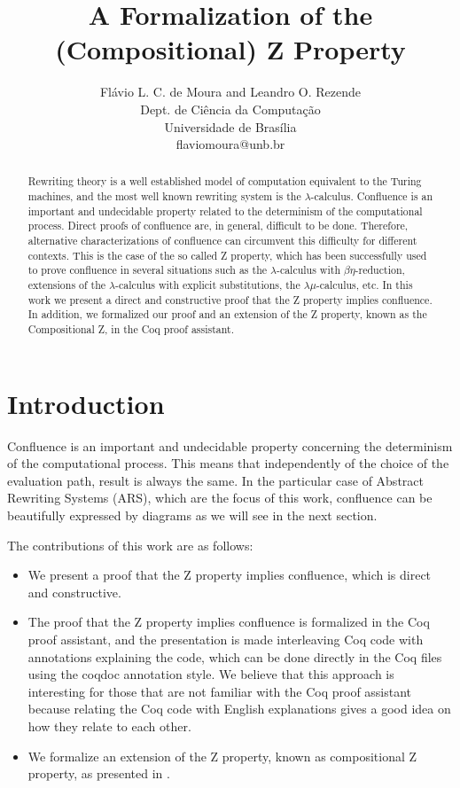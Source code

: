 \documentclass[a4paper]{article}
\title{A Formalization of the (Compositional) Z Property}
\author{
Flávio L. C. de Moura and Leandro O. Rezende\\ Dept. de Ciência da Computação\\
                Universidade de Brasília \\ flaviomoura@unb.br
}
\begin{document}
\maketitle

\begin{abstract}
  Rewriting theory is a well established model of computation
  equivalent to the Turing machines, and the most well known rewriting
  system is the $\lambda$-calculus. Confluence is an important and
  undecidable property related to the determinism of the computational
  process. Direct proofs of confluence are, in general, difficult to
  be done. Therefore, alternative characterizations of confluence can
  circumvent this difficulty for different contexts. This is the case
  of the so called Z property, which has been successfully used to
  prove confluence in several situations such as the
  $\lambda$-calculus with $\beta\eta$-reduction, extensions of the
  $\lambda$-calculus with explicit substitutions, the
  $\lambda\mu$-calculus, etc. In this work we present a direct and
  constructive proof that the Z property implies confluence.  In
  addition, we formalized our proof and an extension of the Z
  property, known as the Compositional Z, in the Coq proof assistant.
\end{abstract}
\vskip 32pt


\section{Introduction}

Confluence is an important and undecidable property concerning the
determinism of the computational process. This means that
independently of the choice of the evaluation path, result is always
the same. In the particular case of Abstract Rewriting Systems (ARS),
which are the focus of this work, confluence can be beautifully
expressed by diagrams as we will see in the next section.

The contributions of this work are as follows:
\begin{itemize}
\item We present a proof that the Z property implies confluence,
  which is direct and constructive.
\item The proof that the Z property implies confluence is formalized
  in the Coq proof assistant, and the presentation is made
  interleaving Coq code with annotations explaining the code, which 
can be done directly in the Coq files using the coqdoc annotation style. 
We believe that this approach is interesting for those that are not 
familiar with the Coq proof assistant because relating the Coq code with 
English explanations gives a good idea on how they relate to each other.
\item We formalize an extension of the Z property, known as
  compositional Z property, as presented in
  \cite{Nakazawa-Fujita2016}.
\end{itemize}
\end{document}
